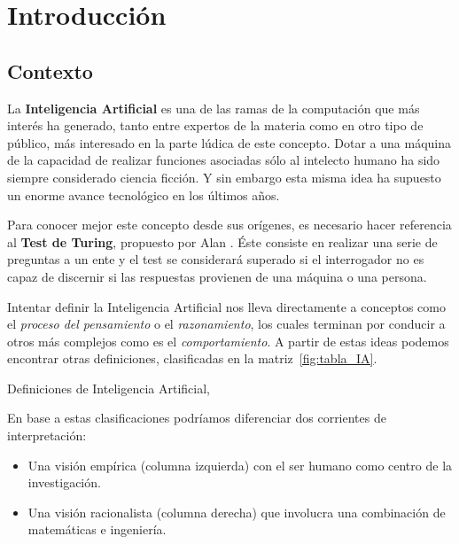 \chapter{Introducción}
\label{cap:introduccion}



\section{Contexto}
La \textbf{Inteligencia Artificial} es una de las ramas de la computación que más interés ha generado, tanto entre expertos de la materia como en otro tipo de público, más interesado en la parte lúdica de este concepto. Dotar a una máquina de la capacidad de realizar funciones asociadas sólo al intelecto humano ha sido siempre considerado ciencia ficción. Y sin embargo esta misma idea ha supuesto un enorme avance tecnológico en los últimos años.

Para conocer mejor este concepto desde sus orígenes, es necesario hacer referencia al \textbf{Test de Turing}, propuesto por Alan \citet{Turing1950-TURCMA}. Éste consiste en realizar una serie de preguntas a un ente y el test se considerará superado si el interrogador no es capaz de discernir si las respuestas provienen de una máquina o una persona.

Intentar definir la Inteligencia Artificial nos lleva directamente a conceptos como el \textit{proceso del pensamiento} o el \textit{razonamiento}, los cuales terminan por conducir a otros más complejos como es el \textit{comportamiento}. A partir de estas ideas podemos encontrar otras definiciones, clasificadas en la matriz~\ref{fig:tabla_IA}.

%
       {Definiciones de Inteligencia Artificial, \citet{Russell:2009:AIM:1671238}}

En base a estas clasificaciones podríamos diferenciar dos corrientes de interpretación:
\begin{itemize}
    \item Una visión empírica (columna izquierda) con el ser humano como centro de la investigación.
    \item Una visión racionalista (columna derecha) que involucra una combinación de matemáticas e ingeniería.
\end{itemize}

